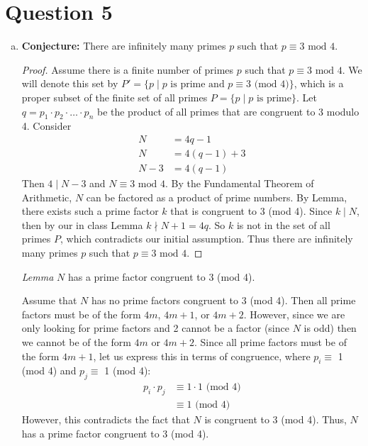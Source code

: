 \documentclass[11pt, oneside]{article}   	%
\begin{document}
\section*{Question 5}
\begin{enumerate}[(a)]
	\item \textbf{Conjecture:} There are infinitely many primes $p$ such that $p \equiv 3 \text{ mod } 4$.


	\begin{proof}
	Assume there is a finite number of primes $p$ such that $p \equiv 3 \text{ mod } 4$.  We will denote this set by $P' = \{ p \mid p \text{ is prime and } p \equiv 3 \text{ (mod 4)}\}$, which is a proper subset of the finite set of all primes $P = \{p \mid p \text{ is prime}\}$. Let $q= p_1 \cdot p_2 \cdot \ldots \cdot p_n$ be the product of all primes that are congruent to 3 modulo 4. Consider
	\begin{align*}
		N & = 4q - 1 \\
		N &= 4(q-1)+ 3 \\
		N - 3 &= 4(q-1)
	\end{align*}	
	Then $4 \mid N-3$ and $N \equiv 3 \text{ mod } 4$. By the Fundamental Theorem of Arithmetic, $N$ can be factored as a product of prime numbers. By Lemma, there exists such a prime factor $k$ that is congruent to 3 (mod 4). Since $k \mid N$, then by our in class Lemma $k \nmid N + 1 = 4q$. So $k$ is not in the set of all primes $P$, which contradicts our initial assumption. Thus there are infinitely many primes $p$ such that $p \equiv 3 \text{ mod } 4$.
	\end{proof}
	
	\emph{Lemma} $N$ has a prime factor congruent to 3 (mod 4).
	
	Assume that $N$ has no prime factors congruent to 3 (mod 4). Then all prime factors must be of the form $4m$, $4m+1$, or $4m+2$. However, since we are only looking for prime factors and 2 cannot be a factor (since $N$ is odd) then we cannot be of the form $4m$ or $4m+2$. Since all prime factors must be of the form $4m+1$, let us express this in terms of congruence, where $p_i \equiv$ 1 (mod 4) and $p_j \equiv$ 1 (mod 4):
	\begin{align*}
		p_i \cdot p_j & \equiv 1 \cdot 1 \text{ (mod 4)} \\
		& \equiv 1 \text{ (mod 4)}
	\end{align*}
	However, this contradicts the fact that $N$ is congruent to 3 (mod 4). Thus, $N$ has a prime factor congruent to 3 (mod 4).
	

\end{enumerate}
\end{document}

